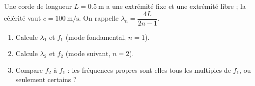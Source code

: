 \documentclass[11pt,a4paper]{article}
\begin{document}
\begin{exo}
Une corde de longueur $L=\SI{0.5}{\metre}$ a une extrémité fixe et une extrémité libre ; la
célérité vaut $c=\SI{100}{\metre\per\second}$. On rappelle $\lambda_n=\dfrac{4L}{2n-1}$.
\begin{enumerate}[label=\alph*)]
  \item Calcule $\lambda_1$ et $f_1$ (mode fondamental, $n=1$).
  \item Calcule $\lambda_2$ et $f_2$ (mode suivant, $n=2$).
  \item Compare $f_2$ à $f_1$ : les fréquences propres sont-elles tous les multiples de $f_1$,
        ou seulement certains ?
\end{enumerate}
\end{exo}
\end{document}
